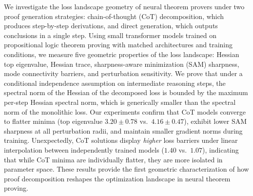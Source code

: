 We investigate the loss landscape geometry of neural theorem provers under two
proof generation strategies: chain-of-thought (CoT) decomposition, which
produces step-by-step derivations, and direct generation, which outputs
conclusions in a single step. Using small transformer models trained on
propositional logic theorem proving with matched architectures and training
conditions, we measure five geometric properties of the loss landscape: Hessian
top eigenvalue, Hessian trace, sharpness-aware minimization (SAM) sharpness,
mode connectivity barriers, and perturbation sensitivity. We prove that under a
conditional independence assumption on intermediate reasoning steps, the
spectral norm of the Hessian of the decomposed loss is bounded by the maximum
per-step Hessian spectral norm, which is generically smaller than the spectral
norm of the monolithic loss. Our experiments confirm that CoT models converge to
flatter minima (top eigenvalue $3.20 \pm 0.78$ vs.\ $4.16 \pm 0.47$), exhibit
lower SAM sharpness at all perturbation radii, and maintain smaller gradient
norms during training. Unexpectedly, CoT solutions display \emph{higher} loss
barriers under linear interpolation between independently trained models ($1.40$
vs.\ $1.07$), indicating that while CoT minima are individually flatter, they
are more isolated in parameter space. These results provide the first geometric
characterization of how proof decomposition reshapes the optimization landscape
in neural theorem proving.
